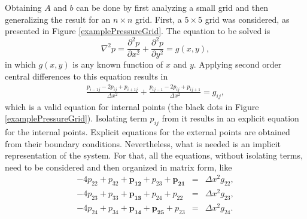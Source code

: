 \documentclass[journal]{IEEEtran}
\begin{document}
Obtaining $A$ and $b$ can be done by first analyzing a small grid and then generalizing the result for an $n\times n$ grid. First, a $5\times 5$ grid was considered, as presented in Figure \ref{examplePressureGrid}. The equation to be solved is \begin{equation}
\nabla^2 p = \frac{\partial^2 p}{\partial x^2} + \frac{\partial^2 p}{\partial y^2} = g(x,y), \label{poissonEquation}
\end{equation} in which $g(x,y)$ is any known function of $x$ and $y$. Applying second order central differences to this equation results in \begin{eqnarray}
\frac{p_{i-1j} - 2p_{ij} + p_{i+1j}}{\Delta x^2}	+ \frac{p_{ij-1} - 2p_{ij} + p_{ij+1}}{\Delta x^2} = g_{ij},\label{poissonSecond}
\end{eqnarray} which is a valid equation for internal points (the black dots in Figure \ref{examplePressureGrid}). Isolating term $p_{ij}$ from it results in an explicit equation for the internal points. Explicit equations for the external points are obtained from their boundary conditions. Nevertheless, what is needed is an implicit representation of the system. For that, all the equations, without isolating terms, need to be considered and then organized in matrix form, like \begin{eqnarray}
-4p_{22} + p_{32} + \boldsymbol{p_{12}} + p_{23} + \boldsymbol{p_{21}} &=& \Delta x^2 g_{22}, \label{internalPoissonEq1}\\
-4p_{23} + p_{33} + \boldsymbol{p_{13}} + p_{24} + p_{22} &=& \Delta x^2 g_{23}\label{internalPoissonEq2},\\
-4p_{24} + p_{34} + \boldsymbol{p_{14}} + \boldsymbol{p_{25}} + p_{23} &=& \Delta x^2 g_{24}.\label{internalPoissonEq3}
\end{eqnarray}
\end{document}
